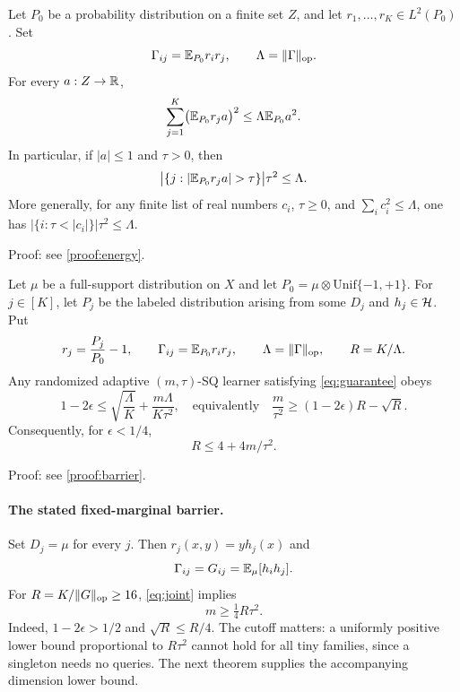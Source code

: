 \begin{lemma}\label{thm:energy}
Let $P_0$ be a probability distribution on a finite set $Z$, and let $r_1,\ldots,r_K\in L^2(P_0)$. Set
\[
 \Gamma_{ij}=\mathbb E_{P_0}r_i r_j,\qquad \Lambda=\|\Gamma\|_{\mathrm{op}}.
\]
For every $a:Z\to\mathbb R$,
\begin{equation}\label{eq:energy}
 \sum_{j=1}^K\bigl(\mathbb E_{P_0}r_j a\bigr)^2
 \leq\Lambda\mathbb E_{P_0}a^2.
\end{equation}
In particular, if $|a|\leq1$ and $\tau>0$, then
\begin{equation}\label{eq:count}
 \bigl|\{j:|\E_{P_0}r_j a|>\tau\}\bigr|\tau^2\leq\Lambda.
\end{equation}
More generally, for any finite list of real numbers $c_i$, $\tau\geq0$, and $\sum_i c_i^2\leq\Lambda$, one has \mbox{$|\{i:\tau<|c_i|\}|\tau^2\leq\Lambda$}.
\end{lemma}

\noindent Proof: see \cref{proof:energy}.\par



\begin{theorem}\label{thm:barrier}
Let $\mu$ be a full-support distribution on $X$ and let $P_0=\mu\otimes\mathrm{Unif}\{-1,+1\}$. For $j\in[K]$, let $P_j$ be the labeled distribution arising from some $D_j$ and $h_j\in\mathcal H$. Put
\[
 r_j=\frac{P_j}{P_0}-1,\qquad
 \Gamma_{ij}=\mathbb E_{P_0}r_i r_j,\qquad
 \Lambda=\|\Gamma\|_{\mathrm{op}},\qquad R=K/\Lambda.
\]
Any randomized adaptive $(m,\tau)$-SQ learner satisfying \eqref{eq:guarantee} obeys
\begin{equation}\label{eq:joint}
 1-2\epsilon\leq\sqrt{\frac\Lambda K}+
 \frac{m\Lambda}{K\tau^2},
 \quad\text{equivalently}\quad
 \frac m{\tau^2}\geq(1-2\epsilon)R-\sqrt R.
\end{equation}
Consequently, for $\epsilon<1/4$,
\begin{equation}\label{eq:Rbound}
 R\leq4+4m/\tau^2.
\end{equation}
\end{theorem}

\noindent Proof: see \cref{proof:barrier}.\par


\paragraph{The stated fixed-marginal barrier.}
Set $D_j=\mu$ for every $j$. Then $r_j(x,y)=y h_j(x)$ and
\[
 \Gamma_{ij}=G_{ij}=\mathbb E_\mu[h_i h_j].
\]
For $R=K/\|G\|_{\mathrm{op}}\geq16$, \eqref{eq:joint} implies
\begin{equation}\label{eq:fixed}
 m\geq\tfrac14 R\tau^2.
\end{equation}
Indeed, $1-2\epsilon>1/2$ and $\sqrt R\leq R/4$. The cutoff matters: a uniformly positive lower bound proportional to $R\tau^2$ cannot hold for all tiny families, since a singleton needs no queries. The next theorem supplies the accompanying dimension lower bound.

